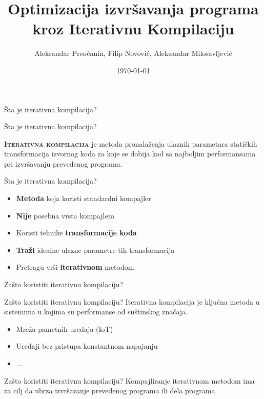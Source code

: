 \documentclass[10pt]{beamer}
\title{ Optimizacija izvršavanja programa kroz Iterativnu Kompilaciju }
\date{\today}
\date{}
\author{Aleksandar Preočanin, Filip Novović, Aleksandar Milosavljević}
\institute{Univerzitet u Beogradu, Matematički fakultet}
\begin{document}
\maketitle

\begin{frame}[standout]
  Šta je iterativna kompilacija?
\end{frame}

\begin{frame}[fragile]{Šta je iterativna kompilacija?}

  {\textbf{\textsc{Iterativna kompilacija}}\xspace} je metoda pronalaženja ulaznih parametara statičkih transformacija
  izvornog koda za koje se dobija kod sa najboljim performansama pri izvršavanju prevedenog programa.
\end{frame}

\begin{frame}[fragile]{Šta je iterativna kompilacija?}
  \begin{itemize}[<+- | alert@+>]
    \item \textbf{Metoda} koja koristi standardni kompajler
    \item \textbf{Nije} posebna vrsta kompajlera
    \item Koristi tehnike \textbf{transformacije koda}
    \item \textbf{Traži} idealne ulazne parametre tih transformacija
    \item Pretragu vrši \textbf{iterativnom} metodom
  \end{itemize}
\end{frame}

\begin{frame}[standout]
  Zašto koristiti iterativnu kompilaciju?
\end{frame}
\begin{frame}[fragile]{Zašto koristiti iterativnu kompilaciju?}
  Iterativna kompilacija je ključna metoda u sistemima u kojima su performanse od suštinskog značaja.
  \begin{itemize}[<+- | alert@+>]
    \item Mreža pametnih uređaja (IoT)
    \item Uređaji bez pristupa konstantnom napajanju
    \item {...}
  \end{itemize}
\end{frame}


\begin{frame}[fragile]{Zašto koristiti iterativnu kompilaciju?}
  Kompajliranje iterativnom metodom ima za cilj da ubrza izvršavanje prevedenog programa ili dela programa.
\end{frame}
\end{document}
